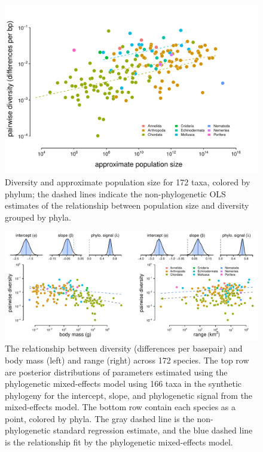 \documentclass[11pt]{article}
\begin{document}
\begin{figure}[!htb]
  \centering
  \includegraphics[width=\textwidth]{figures/diversity_popsize_averages.pdf}

  \caption{Diversity and approximate population size for 172 taxa, colored by
    phylum; the dashed lines indicate the non-phylogenetic OLS estimates of the
  relationship between population size and diversity grouped by phyla.}

  \label{suppfig:figure-1-ave}
\end{figure}


\begin{figure}[!htb] \centering
  \includegraphics[width=\textwidth]{figures/diversity_range_bodymass.pdf}

  \caption{The relationship between diversity (differences per basepair) and
    body mass (left) and range (right) across 172 species. The top row are
    posterior distributions of parameters estimated using the phylogenetic
    mixed-effects model using 166 taxa in the synthetic phylogeny for the
    intercept, slope, and phylogenetic signal from the mixed-effects model. The
    bottom row contain each species as a point, colored by phyla. The gray
    dashed line is the non-phylogenetic standard regression estimate, and the
    blue dashed line is the relationship fit by the phylogenetic mixed-effects
  model. }

  \label{suppfig:figure-div-range-bodymass}
\end{figure}
\end{document}
